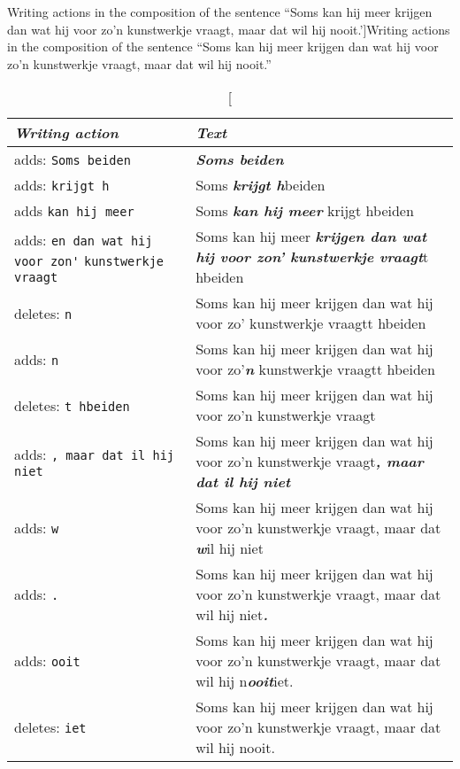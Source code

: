 \begin{paper}
\renewcommand*{\thefootnote}{\fnsymbol{footnote}}
\begin{table}[!ht]
\centering\footnotesize\renewcommand{\arraystretch}{1.5}
\caption[Writing actions in the composition of the sentence ``Soms kan
hij meer krijgen dan wat hij voor zo'n kunstwerkje vraagt, maar dat wil
hij nooit.']{Writing actions in the composition of the sentence ``Soms kan
hij meer krijgen dan wat hij voor zo'n kunstwerkje vraagt, maar dat wil
hij nooit.''\footnotemark[1]}
\begin{tabular}{p{}p{}}
\toprule
\textit{Writing action} & \textit{Text}\tabularnewline
\midrule
adds: \verb|Soms beiden| & \emph{\textbf{Soms beiden}}\tabularnewline
adds: \verb|krijgt h| & Soms \emph{\textbf{krijgt
h}}beiden\tabularnewline
adds \verb|kan hij meer| & Soms \emph{\textbf{kan hij meer}} krijgt
hbeiden\tabularnewline
adds: \verb|en dan wat hij voor zon'| \newline \verb|kunstwerkje vraagt| & Soms kan hij
meer \emph{\textbf{krijgen dan wat hij voor zon' kunstwerkje vraagt}}t
hbeiden\tabularnewline
deletes: \verb|n| & Soms kan hij meer krijgen dan wat hij voor zo'
kunstwerkje vraagtt hbeiden\tabularnewline
adds: \verb|n| & Soms kan hij meer krijgen dan wat hij voor
zo'\emph{\textbf{n}} kunstwerkje vraagtt hbeiden\tabularnewline
deletes: \verb|t hbeiden|& Soms kan hij meer krijgen dan wat hij voor
zo'n kunstwerkje vraagt\tabularnewline
adds: \verb|, maar dat il hij niet| & Soms kan hij meer krijgen dan wat
hij voor zo'n kunstwerkje vraagt\emph{\textbf{, maar dat il hij
niet}}\tabularnewline
adds: \verb|w| & Soms kan hij meer krijgen dan wat hij voor zo'n
kunstwerkje vraagt, maar dat \emph{\textbf{w}}il hij niet\tabularnewline
adds: \verb|.| & Soms kan hij meer krijgen dan wat hij voor zo'n
kunstwerkje vraagt, maar dat wil hij
niet\emph{\textbf{.}}\tabularnewline
adds: \verb|ooit| & Soms kan hij meer krijgen dan wat hij voor zo'n
kunstwerkje vraagt, maar dat wil hij
n\emph{\textbf{ooit}}iet.\tabularnewline
deletes: \verb|iet| & Soms kan hij meer krijgen dan wat hij voor zo'n
kunstwerkje vraagt, maar dat wil hij nooit.\tabularnewline
\bottomrule
\end{tabular}
\label{tab:bekius:soms}
\end{table}


\end{paper}

